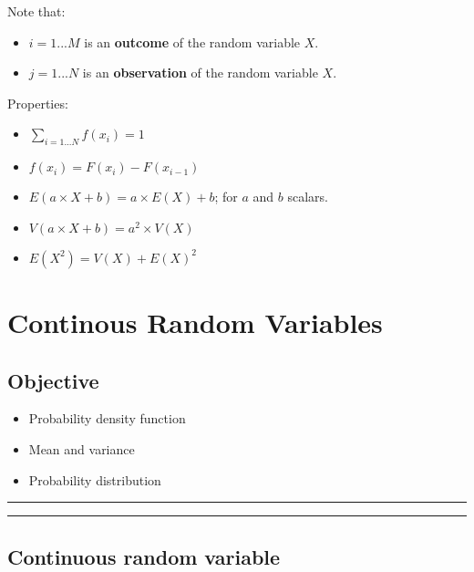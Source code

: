 \documentclass[
]{book}
\providecommand{\tightlist}{%
  \setlength{\itemsep}{0pt}\setlength{\parskip}{0pt}}
\begin{document}
Note that:

\begin{itemize}
\tightlist
\item
  \(i=1...M\) is an \textbf{outcome} of the random variable \(X\).
\item
  \(j=1...N\) is an \textbf{observation} of the random variable \(X\).
\end{itemize}

Properties:

\begin{itemize}
\tightlist
\item
  \(\sum_{i=1...N} f(x_i)=1\)
\item
  \(f(x_i)=F(x_i)-F(x_{i-1})\)
\item
  \(E(a\times X +b)= a\times E(X) +b\); for \(a\) and \(b\) scalars.
\item
  \(V(a\times X +b)= a^2\times V(X)\)
\item
  \(E(X^2)=V(X)+E(X)^2\)
\end{itemize}

\hypertarget{continous-random-variables}{%
\chapter{Continous Random Variables}\label{continous-random-variables}}

\hypertarget{objective-4}{%
\section{Objective}\label{objective-4}}

\begin{itemize}
\tightlist
\item
  Probability density function
\item
  Mean and variance
\item
  Probability distribution
\end{itemize}

\begin{center}\rule{0.5\linewidth}{0.5pt}\end{center}

\begin{center}\rule{0.5\linewidth}{0.5pt}\end{center}

\hypertarget{continuous-random-variable}{%
\section{Continuous random variable}\label{continuous-random-variable}}
\end{document}
